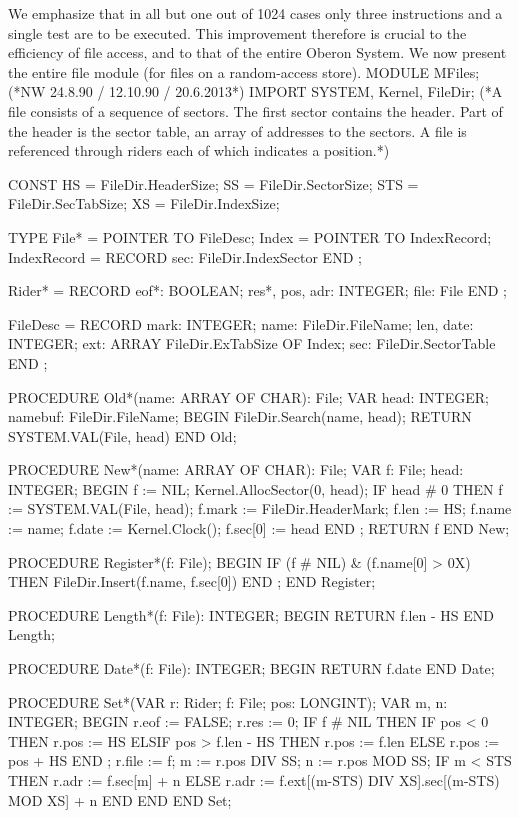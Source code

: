\noindent We emphasize that in all but one out of 1024 cases only three instructions and a single test are to be executed. This improvement therefore is crucial to the efficiency of file access, and to that of the entire Oberon System. We now present the entire file module (for files on a random-access store).
\begintt
MODULE MFiles; (*NW 24.8.90 / 12.10.90 / 20.6.2013*)
  IMPORT SYSTEM, Kernel, FileDir;
  (*A file consists of a sequence of sectors. The first sector contains the header.
    Part of the header is the sector table, an array of addresses to the sectors.
    A file is referenced through riders each of which indicates a position.*)
    
  CONST
    HS = FileDir.HeaderSize;
    SS = FileDir.SectorSize;
    STS = FileDir.SecTabSize;
    XS = FileDir.IndexSize;
    
  TYPE File* = POINTER TO FileDesc;
       Index = POINTER TO IndexRecord;
       IndexRecord = RECORD sec: FileDir.IndexSector END ;
  
  Rider* =
    RECORD eof*: BOOLEAN;
      res*, pos, adr: INTEGER;
      file: File END ;
      
  FileDesc =
    RECORD mark: INTEGER;
      name: FileDir.FileName;
      len, date: INTEGER;
      ext: ARRAY FileDir.ExTabSize OF Index;
      sec: FileDir.SectorTable END ;
      
  PROCEDURE Old*(name: ARRAY OF CHAR): File;
  VAR head: INTEGER;
      namebuf: FileDir.FileName;
  BEGIN
    FileDir.Search(name, head); RETURN SYSTEM.VAL(File, head)
  END Old;
    
  PROCEDURE New*(name: ARRAY OF CHAR): File;
  VAR f: File; head: INTEGER;
  BEGIN
    f := NIL; Kernel.AllocSector(0, head);
    IF head # 0 THEN
      f := SYSTEM.VAL(File, head); f.mark := FileDir.HeaderMark;
      f.len := HS; f.name := name;
      f.date := Kernel.Clock(); f.sec[0] := head
    END ;
    RETURN f
  END New;

  PROCEDURE Register*(f: File);
  BEGIN
    IF (f # NIL) & (f.name[0] > 0X) THEN
      FileDir.Insert(f.name, f.sec[0])
    END ;
  END Register;
  
  PROCEDURE Length*(f: File): INTEGER;
  BEGIN
    RETURN f.len - HS
  END Length;

  PROCEDURE Date*(f: File): INTEGER;
  BEGIN
    RETURN f.date
  END Date;
  
  PROCEDURE Set*(VAR r: Rider; f: File; pos: LONGINT);
  VAR m, n: INTEGER;
  BEGIN
    r.eof := FALSE; r.res := 0;
    IF f # NIL THEN
      IF pos < 0 THEN r.pos := HS
      ELSIF pos > f.len - HS THEN r.pos := f.len
      ELSE r.pos := pos + HS
      END ;
      r.file := f; m := r.pos DIV SS; n := r.pos MOD SS;
      IF m < STS THEN r.adr := f.sec[m] + n
      ELSE r.adr := f.ext[(m-STS) DIV XS].sec[(m-STS) MOD XS] + n
      END
    END
  END Set;
    
